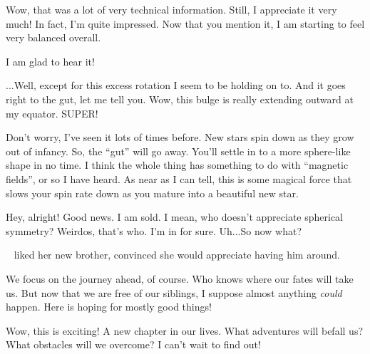 \documentclass[main.tex]{subfiles}
\begin{document}
\newpara \Lacedaemon Wow, that was a lot of very technical information.  Still, I appreciate it very much!  In fact, I'm quite impressed.  Now that you mention it, I am starting to feel very balanced overall.  

\newpara \Celaeno I am glad to hear it!

\newpara \Lacedaemon ...Well, except for this excess rotation I seem to be holding on to. And it goes right to the gut, let me tell you.  Wow, this bulge is really extending outward at my equator.  SUPER!  

\newpara \Celaeno Don't worry, I've seen it lots of times before.  New stars spin down as they grow out of infancy.  So, the ``gut'' will go away.  You'll settle in to a more sphere-like shape in no time.  I think the whole thing has something to do with ``magnetic fields'', or so I have heard.  As near as I can tell, this is some magical force that slows your spin rate down as you mature into a beautiful new star.

\newpara \Lacedaemon Hey, alright!  Good news.  I am sold.  I mean, who doesn't appreciate spherical symmetry?  Weirdos, that's who.  I'm in for sure.  Uh...So now what?

\newpara \nar \rmcelaeno~ liked her new brother, convinced she would appreciate having him around.

\newpara \Celaeno We focus on the journey ahead, of course.  Who knows where our fates will take us.  But now that we are free of our siblings, I suppose almost anything \textit{could} happen.  Here is hoping for mostly good things!

\newpara \Lacedaemon  Wow, this is exciting!  A new chapter in our lives.  What adventures will befall us?  What obstacles will we overcome?  I can't wait to find out!
\end{document}

